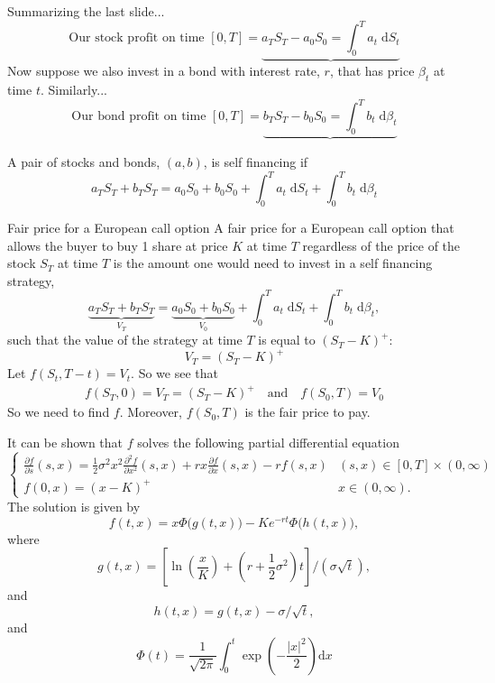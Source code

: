 \documentclass{beamer}%
\numberwithin{equation}{section}
\newcommand{\ud}{\ensuremath{\mathrm{d} }}
\begin{document}
	\begin{frame}
		Summarizing the last slide...
		\[ 
		\text{Our stock profit on time $[0,T]$} = \underbrace{a_TS_T - a_0S_0  =  \int_0^T a_t \; \ud S_t }
		\]
		Now suppose we also invest in a bond with interest rate, $r$, that has price $\beta_t$ at time $t$. Similarly...
		\[
		\text{Our bond profit on time $[0,T]$} = \underbrace{b_TS_T - b_0S_0  =  \int_0^T b_t \; \ud \beta_t} 
		\]
		\begin{definition}
			A pair of stocks and bonds, $(a,b)$, is self financing if 
			\[
			a_TS_T + b_TS_T = a_0S_0 + b_0S_0 +  \int_0^T a_t \; \ud S_t + \int_0^T b_t \; \ud \beta_t 
			\]
		\end{definition}
	\end{frame}
	
	\begin{frame}{Fair price for a European call option}
		A fair price for a European call option that allows the buyer to buy 1 share at price $K$ at time $T$ regardless of the price of the stock $S_T$ at time $T$ is the amount one would need to invest in a self financing strategy,
		\[
		\underbrace{a_TS_T + b_TS_T}_{V_T} = \underbrace{a_0S_0 + b_0S_0}_{V_0} +  \int_0^T a_t \; \ud S_t + \int_0^T b_t \; \ud \beta_t ,
		\]
		such that the value of the strategy at time $T$ is equal to $(S_T - K)^+$:
		\[
		V_T = (S_T - K)^+
		\]
		Let $f(S_t, T-t) = V_t$. So we see that
		\begin{align*}
		f(S_T, 0) = V_T = (S_T - K)^+ \quad \text{and} \quad  f(S_0, T) =V_0
		\end{align*}
		So we need to find $f$. Moreover, $f(S_0, T)$ is the fair price to pay. 
	\end{frame}
	
	\begin{frame}
		It can be shown that $f$ solves the following partial differential equation 
		\[
		\begin{cases}
		\frac{\partial f}{\partial s}(s, x) = \frac{1}{2} \sigma^2 x^2 \frac{\partial^2f}{\partial x^2}(s,x) + rx\frac{\partial f}{\partial x}(s,x) - r f(s,x) & (s,x) \in [0,T] \times (0,\infty) \\
		f(0,x) = (x-K)^+ & x \in (0,\infty).
		\end{cases}
		\]
		The solution is given by 
		\[
		f(t,x) = x \Phi\big(g(t,x)\big) - K e^{-rt}\Phi\big( h(t,x) \big),
		\]
		where
		\[
		g(t,x) = \left[ \ln\left(\frac{x}{K}\right) + \left(r  +\frac{1}{2} \sigma^2\right) t \right] / (\sigma \sqrt{t}),
		\]
		and
		\[
		h(t,x) = g(t,x) - \sigma / \sqrt{t},
		\]
		and
		\[
		\Phi(t) = \frac{1}{\sqrt{2\pi}}\int_0^t \exp\left(-\frac{|x|^2}{2}\right) \ud x
		\]
	\end{frame}
	
\end{document}
